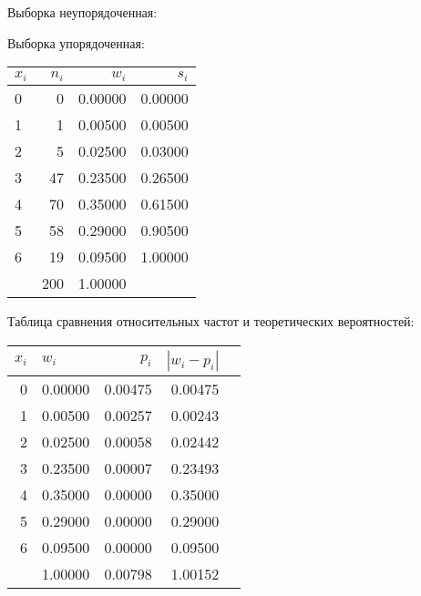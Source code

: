 Выборка неупорядоченная:\newline

\newpage
Выборка упорядоченная:\newline

\newpage


\begin{center}
\begin{tabular}{| l | r | r | r |}
\hline
$x_i$ & $n_i$ & $w_i$ & $s_i$ \\\hline
0 & 0 & 0.00000 & 0.00000 \\\hline
1 & 1 & 0.00500 & 0.00500 \\\hline
2 & 5 & 0.02500 & 0.03000 \\\hline
3 & 47 & 0.23500 & 0.26500 \\\hline
4 & 70 & 0.35000 & 0.61500 \\\hline
5 & 58 & 0.29000 & 0.90500 \\\hline
6 & 19 & 0.09500 & 1.00000 \\\hline
  & 200 & 1.00000 &   \\\hline
\end{tabular}
\end{center}

\newline

\newline
Таблица сравнения относительных частот и теоретических вероятностей:\newline
\begin{center}
\begin{tabular}{| r | l | r | r | r |}
\hline
$x_i$ & $w_i$ & $p_i$ & $|w_i-p_i|$ \\\hline
0 & 0.00000 & 0.00475 & 0.00475 \\\hline
1 & 0.00500 & 0.00257 & 0.00243 \\\hline
2 & 0.02500 & 0.00058 & 0.02442 \\\hline
3 & 0.23500 & 0.00007 & 0.23493 \\\hline
4 & 0.35000 & 0.00000 & 0.35000 \\\hline
5 & 0.29000 & 0.00000 & 0.29000 \\\hline
6 & 0.09500 & 0.00000 & 0.09500 \\\hline
  & 1.00000 & 0.00798 & 1.00152 \\\hline
\end{tabular}
\end{center}
